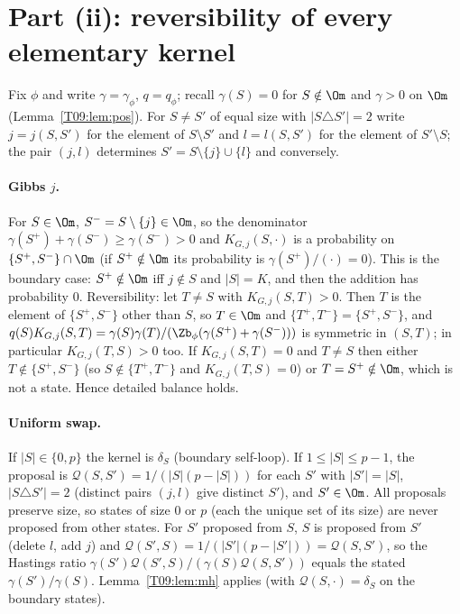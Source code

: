 \documentclass[11pt]{report}
\begin{document}
\section{Part (ii): reversibility of every elementary kernel}

Fix $\phi$ and write $\gamma=\gamma_\phi$, $q=q_\phi$; recall $\gamma(S)=0$ for $S\notin\Om$ and $\gamma>0$ on $\Om$ (Lemma~\ref{T09:lem:pos}). For $S\ne S'$ of equal size with $|S\triangle S'|=2$ write $j=j(S,S')$ for the element of $S\setminus S'$ and $l=l(S,S')$ for the element of $S'\setminus S$; the pair $(j,l)$ determines $S'=S\setminus\{j\}\cup\{l\}$ and conversely.

\paragraph{Gibbs $j$.} For $S\in\Om$, $S^-=S\setminus\{j\}\in\Om$, so the denominator $\gamma(S^+)+\gamma(S^-)\ge\gamma(S^-)>0$ and $K_{G,j}(S,\cdot)$ is a probability on $\{S^+,S^-\}\cap\Om$ (if $S^+\notin\Om$ its probability is $\gamma(S^+)/(\cdot)=0$). This is the boundary case: $S^+\notin\Om$ iff $j\notin S$ and $|S|=K$, and then the addition has probability $0$. Reversibility: let $T\ne S$ with $K_{G,j}(S,T)>0$. Then $T$ is the element of $\{S^+,S^-\}$ other than $S$, so $T\in\Om$ and $\{T^+,T^-\}=\{S^+,S^-\}$, and
$q(S)K_{G,j}(S,T)=\gamma(S)\gamma(T)/(\Zb_\phi(\gamma(S^+)+\gamma(S^-)))$ is symmetric in $(S,T)$; in particular $K_{G,j}(T,S)>0$ too. If $K_{G,j}(S,T)=0$ and $T\neq S$ then either $T\notin\{S^+,S^-\}$ (so $S\notin\{T^+,T^-\}$ and $K_{G,j}(T,S)=0$) or $T=S^+\notin\Om$, which is not a state. Hence detailed balance holds.

\paragraph{Uniform swap.} If $|S|\in\{0,p\}$ the kernel is $\delta_S$ (boundary self-loop). If $1\le|S|\le p-1$, the proposal is $\mathcal Q(S,S')=1/(|S|(p-|S|))$ for each $S'$ with $|S'|=|S|$, $|S\triangle S'|=2$ (distinct pairs $(j,l)$ give distinct $S'$), and $S'\in\Om$. All proposals preserve size, so states of size $0$ or $p$ (each the unique set of its size) are never proposed from other states. For $S'$ proposed from $S$, $S$ is proposed from $S'$ (delete $l$, add $j$) and $\mathcal Q(S',S)=1/(|S'|(p-|S'|))=\mathcal Q(S,S')$, so the Hastings ratio $\gamma(S')\mathcal Q(S',S)/(\gamma(S)\mathcal Q(S,S'))$ equals the stated $\gamma(S')/\gamma(S)$. Lemma~\ref{T09:lem:mh} applies (with $\mathcal Q(S,\cdot)=\delta_S$ on the boundary states).
\end{document}
